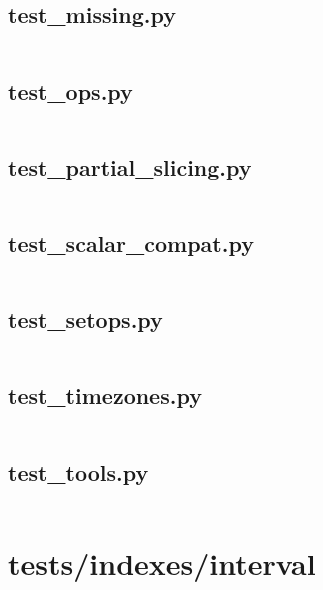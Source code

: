 \documentclass{article}
\begin{document}
\subsection{test\_missing.py}
\inputminted{python}{/home/dufferzafar/dev/@clones/pandas/pandas/tests/indexes/datetimes/test_missing.py}
\newpage

\subsection{test\_ops.py}
\inputminted{python}{/home/dufferzafar/dev/@clones/pandas/pandas/tests/indexes/datetimes/test_ops.py}
\newpage

\subsection{test\_partial\_slicing.py}
\inputminted{python}{/home/dufferzafar/dev/@clones/pandas/pandas/tests/indexes/datetimes/test_partial_slicing.py}
\newpage

\subsection{test\_scalar\_compat.py}
\inputminted{python}{/home/dufferzafar/dev/@clones/pandas/pandas/tests/indexes/datetimes/test_scalar_compat.py}
\newpage

\subsection{test\_setops.py}
\inputminted{python}{/home/dufferzafar/dev/@clones/pandas/pandas/tests/indexes/datetimes/test_setops.py}
\newpage

\subsection{test\_timezones.py}
\inputminted{python}{/home/dufferzafar/dev/@clones/pandas/pandas/tests/indexes/datetimes/test_timezones.py}
\newpage

\subsection{test\_tools.py}
\inputminted{python}{/home/dufferzafar/dev/@clones/pandas/pandas/tests/indexes/datetimes/test_tools.py}
\newpage

\section{tests/indexes/interval}
\end{document}
